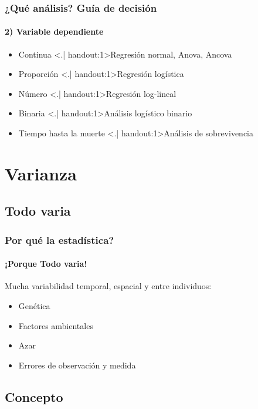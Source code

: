 \documentclass[mathserif]{beamer}
\begin{document}
\begin{frame}[label=whichan2]
\frametitle{¿Qu\'e an\'alisis? Gu\'ia de decisi\'on}
\framesubtitle{2) Variable dependiente}
 \begin{itemize}[<+-| handout:1>]
   \item Continua \hfill \alert<.| handout:1>{Regresi\'on normal, Anova, Ancova}
   \item Proporci\'on \hfill \alert<.| handout:1>{Regresi\'on log\'istica}
   \item N\'umero \hfill \alert<.| handout:1>{Regresi\'on log-lineal}
   \item Binaria \hfill \alert<.| handout:1>{An\'alisis log\'istico binario}
   \item Tiempo hasta la muerte \hfill \alert<.| handout:1>{An\'alisis de sobrevivencia}
\end{itemize}
\end{frame}%




\section[Varianza]{Varianza}

\subsection[Todo varia]{Todo varia}

\begin{frame}[label=allvaries]
  \frametitle{Por qu\'e la estad\'istica?}
  \framesubtitle{¡Porque Todo varia!}
  Mucha variabilidad temporal, espacial y entre individuos:
  \begin{itemize}
    \item Gen\'etica
    \item Factores ambientales
    \item Azar
    \item Errores de observaci\'on y medida
  \end{itemize}
\end{frame}%


\subsection[Concepto]{Concepto}
 
\end{document}
